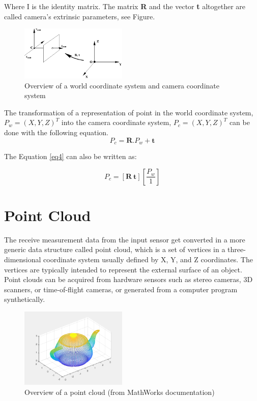 Where I is the identity matrix. The matrix \textbf{R} and the vector \textbf{t} altogether are called camera's extrinsic parameters, see Figure.

\begin{figure}[!h]
\begin{center}
\includegraphics[width=2in]{figures02/extrinsic.png}
\caption{Overview of a world coordinate system and camera coordinate system}%
\end{center}
\end{figure}


The transformation of a representation of point in the world coordinate system, $ P_{w}=(X,Y,Z)^{T}$ into the camera coordinate system, $ P_{c}=(X,Y,Z)^{T}$ can be done with the following equation.
\begin{equation}\label{eq4} 
P_{c}=\textbf{R}.P_{w}+\textbf{t}
\end{equation}

 The Equation \ref{eq4} can also be written as:


\begin{equation}\label{eq5} 
    P_{c}=\left[\textbf{R} \ \textbf{t}\right]\left[\frac{P_{w}}{1}\right]   
\end{equation}

\section{Point Cloud}

 The receive measurement data from the input sensor get converted in a more generic data structure called point cloud, which is a set of vertices in a three-dimensional coordinate system usually defined by X, Y, and Z coordinates. The vertices are typically intended to represent the external surface of an object.
 Point clouds can be acquired from hardware sensors such as stereo cameras, 3D scanners, or time-of-flight cameras, or generated from a computer program synthetically.


\begin{figure}[!h]
\begin{center}
\includegraphics[width=2in]{figures02/pcd.png}
\caption{Overview of a point cloud (from MathWorks documentation)}%
\end{center}
\label{fig2:mypicture3}
\end{figure}


